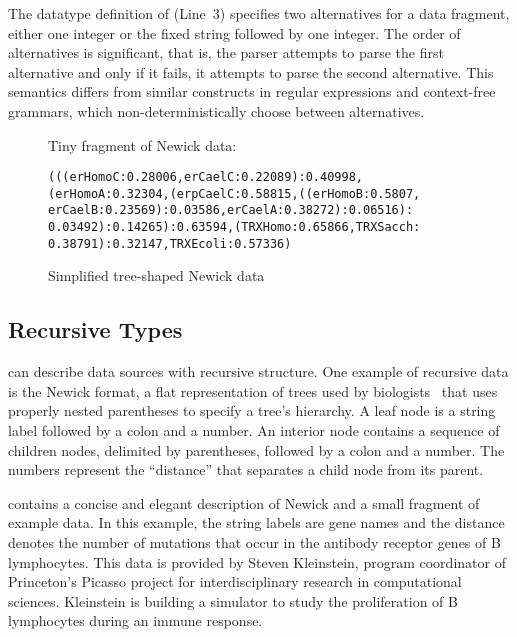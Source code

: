 The datatype definition of  (Line~3) specifies two
alternatives for a data fragment, either one integer or the fixed
string  followed by one integer.  The order of
alternatives is significant, that is, the parser attempts to parse the
first alternative and only if it fails, it attempts to parse the
second alternative.  This semantics differs from similar constructs in
regular expressions and context-free grammars, which
non-deterministically choose between alternatives.
\begin{figure}

Tiny fragment of Newick data:

{\scriptsize
\begin{verbatim}
(((erHomoC:0.28006,erCaelC:0.22089):0.40998,
(erHomoA:0.32304,(erpCaelC:0.58815,((erHomoB:0.5807,
erCaelB:0.23569):0.03586,erCaelA:0.38272):0.06516):
0.03492):0.14265):0.63594,(TRXHomo:0.65866,TRXSacch:
0.38791):0.32147,TRXEcoli:0.57336)
\end{verbatim}
}
  \caption{Simplified tree-shaped Newick data}
  \label{fig:newick}
\end{figure}

\subsection{Recursive Types}

\padsml{} can describe data sources with recursive structure.  One
example of recursive data is the Newick format, a flat representation
of trees used by biologists~\cite{newick} that uses properly nested
parentheses to specify a tree's hierarchy.  A leaf node is a string
label followed by a colon and a number.  An interior node contains a
sequence of children nodes, delimited by parentheses, followed by a
colon and a number.  The numbers represent the ``distance'' that
separates a child node from its parent.

 contains a concise and elegant description of Newick
and a small fragment of example data.  In this example, the string
labels are gene names and the distance denotes the number of mutations
that occur in the antibody receptor genes of B lymphocytes.  This
data is provided by Steven Kleinstein, program coordinator of
Princeton's Picasso project for interdisciplinary research in
computational sciences.  Kleinstein is building a simulator to study
the proliferation of B lymphocytes during an immune response.


